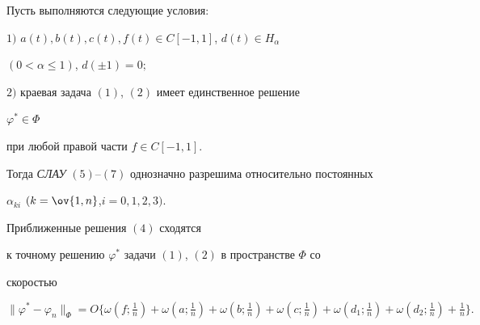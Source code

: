 \begin{thm} 


Пусть выполняются следующие условия\/${:}$ 


 


$1)$ $a(t),b(t),c(t),f(t)\in C[-1,1]$, $d(t)\in H_\alpha$ 


$(0<\alpha\le1)$, $d(\pm1)=0;$ 


 


$2)$ краевая задача $(1)$, $(2)$ имеет единственное решение 


$\varphi^*\in\Phi$ 


при любой правой части $f\in C[-1,1]$. 


 


Тогда {\em СЛАУ} $(5)$--$(7)$ однозначно разрешима относительно постоянных 


$\alpha_{ki}$ $(k=\ov{1,n}$,\linebreak $i=0,1,2,3)$.


Приближенные решения $(4)$ сходятся 


к точному решению $\varphi^*$ задачи $(1)$, $(2)$ в пространстве $\Phi$ со 


скоростью 


\begin{equation} 


\|\varphi^*-\varphi_n\|_\Phi=O\{\omega(f;\tfrac{1}{n})+\omega 


(a;\tfrac{1}{n})+\omega(b;\tfrac{1}{n})+ 


% 


\omega(c;\tfrac{1}{n})+\omega(d_1;\tfrac{1}{n})+ 


\omega(d_2;\tfrac{1}{n})+\tfrac{1}{n}\}. 


\end{equation} 


\end{thm} 


 


